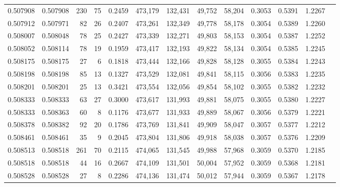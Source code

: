 \begin{tabular}{rrrrrrrrrrrrr}
0.507908 & 0.507908 &   230 &    75 &                                     0.2459 & 473,179 & 132,431 &  49,752 &  58,204 & 0.3053 & 0.5391 & 1.2267 \\
0.507912 & 0.507971 &    82 &    26 &                                     0.2407 & 473,261 & 132,349 &  49,778 &  58,178 & 0.3054 & 0.5389 & 1.2260 \\
0.508007 & 0.508048 &    78 &    25 &                                     0.2427 & 473,339 & 132,271 &  49,803 &  58,153 & 0.3054 & 0.5387 & 1.2252 \\
0.508052 & 0.508114 &    78 &    19 &                                     0.1959 & 473,417 & 132,193 &  49,822 &  58,134 & 0.3054 & 0.5385 & 1.2245 \\
0.508175 & 0.508175 &    27 &     6 &                                     0.1818 & 473,444 & 132,166 &  49,828 &  58,128 & 0.3055 & 0.5384 & 1.2243 \\
0.508198 & 0.508198 &    85 &    13 &                                     0.1327 & 473,529 & 132,081 &  49,841 &  58,115 & 0.3056 & 0.5383 & 1.2235 \\
0.508201 & 0.508201 &    25 &    13 &                                     0.3421 & 473,554 & 132,056 &  49,854 &  58,102 & 0.3055 & 0.5382 & 1.2232 \\
0.508333 & 0.508333 &    63 &    27 &                                     0.3000 & 473,617 & 131,993 &  49,881 &  58,075 & 0.3055 & 0.5380 & 1.2227 \\
0.508333 & 0.508363 &    60 &     8 &                                     0.1176 & 473,677 & 131,933 &  49,889 &  58,067 & 0.3056 & 0.5379 & 1.2221 \\
0.508378 & 0.508382 &    92 &    20 &                                     0.1786 & 473,769 & 131,841 &  49,909 &  58,047 & 0.3057 & 0.5377 & 1.2212 \\
0.508461 & 0.508461 &    35 &     9 &                                     0.2045 & 473,804 & 131,806 &  49,918 &  58,038 & 0.3057 & 0.5376 & 1.2209 \\
0.508513 & 0.508518 &   261 &    70 &                                     0.2115 & 474,065 & 131,545 &  49,988 &  57,968 & 0.3059 & 0.5370 & 1.2185 \\
0.508518 & 0.508518 &    44 &    16 &                                     0.2667 & 474,109 & 131,501 &  50,004 &  57,952 & 0.3059 & 0.5368 & 1.2181 \\
0.508528 & 0.508528 &    27 &     8 &                                     0.2286 & 474,136 & 131,474 &  50,012 &  57,944 & 0.3059 & 0.5367 & 1.2178 \\

\end{tabular}
